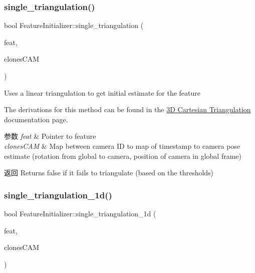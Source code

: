 \subsubsection{\texorpdfstring{single\+\_\+triangulation()}{single\_triangulation()}}
{\footnotesize\ttfamily bool Feature\+Initializer\+::single\+\_\+triangulation (\begin{DoxyParamCaption}\item[{std\+::shared\+\_\+ptr$<$ \hyperlink{classov__core_1_1Feature}{Feature} $>$}]{feat,  }\item[{std\+::unordered\+\_\+map$<$ size\+\_\+t, std\+::unordered\+\_\+map$<$ double, \hyperlink{structov__core_1_1FeatureInitializer_1_1ClonePose}{Clone\+Pose} $>$$>$ \&}]{clones\+C\+AM }\end{DoxyParamCaption})}



Uses a linear triangulation to get initial estimate for the feature 

The derivations for this method can be found in the \hyperlink{update-featinit_featinit-linear}{3D Cartesian Triangulation} documentation page.


\begin{DoxyParams}{参数}
{\em feat} & Pointer to feature \\
\hline
{\em clones\+C\+AM} & Map between camera ID to map of timestamp to camera pose estimate (rotation from global to camera, position of camera in global frame) \\
\hline
\end{DoxyParams}
\begin{DoxyReturn}{返回}
Returns false if it fails to triangulate (based on the thresholds) 
\end{DoxyReturn}
\mbox{\label{classov__core_1_1FeatureInitializer_a97e8070e331293368ed1fedd62458d5e}} 
\subsubsection{\texorpdfstring{single\+\_\+triangulation\+\_\+1d()}{single\_triangulation\_1d()}}
{\footnotesize\ttfamily bool Feature\+Initializer\+::single\+\_\+triangulation\+\_\+1d (\begin{DoxyParamCaption}\item[{std\+::shared\+\_\+ptr$<$ \hyperlink{classov__core_1_1Feature}{Feature} $>$}]{feat,  }\item[{std\+::unordered\+\_\+map$<$ size\+\_\+t, std\+::unordered\+\_\+map$<$ double, \hyperlink{structov__core_1_1FeatureInitializer_1_1ClonePose}{Clone\+Pose} $>$$>$ \&}]{clones\+C\+AM }\end{DoxyParamCaption})}



